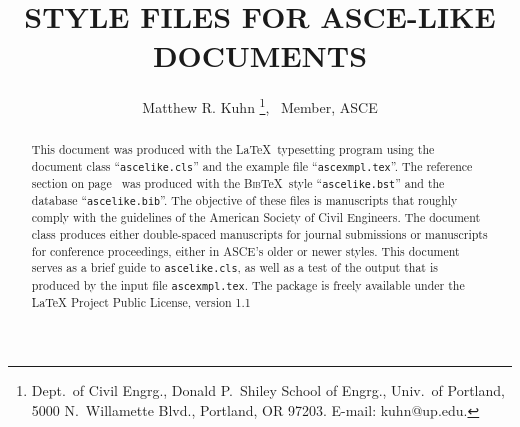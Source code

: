 \documentclass[Proceedings]{ascelike}
\begin{document}
%
\title{STYLE FILES FOR ASCE-LIKE DOCUMENTS}
%
\author{
Matthew R. Kuhn%
%
\thanks{
Dept.\ of Civil Engrg.,
Donald P.\ Shiley School of Engrg., Univ.\ of Portland, 
5000 N.\ Willamette Blvd.,
Portland, OR  97203. E-mail: kuhn@up.edu.},
\ Member, ASCE
%
%
%
%
%
%
}
%
\maketitle
%
\begin{abstract}
This document was produced with the \LaTeX\ typesetting program
using the document class ``\texttt{ascelike.cls}'' and the
example file ``\texttt{ascexmpl.tex}''.
The reference section on page~\pageref{section:references}
was produced with the \textsc{Bib}\TeX\ style ``\texttt{ascelike.bst}''
and the database ``\texttt{ascelike.bib}''.
The objective of these files is manuscripts that roughly comply with the
guidelines of the American Society of Civil Engineers.
The document class
produces either double-spaced manuscripts for journal submissions or
manuscripts for conference proceedings, either in ASCE's older or newer
styles.
This document serves as a brief guide to \texttt{ascelike.cls},
as well as a test of the output that is produced
by the input file \texttt{ascexmpl.tex}.
The package is freely available under the LaTeX 
Project Public License, version 1.1
\end{abstract}
%
%
%
\end{document}
